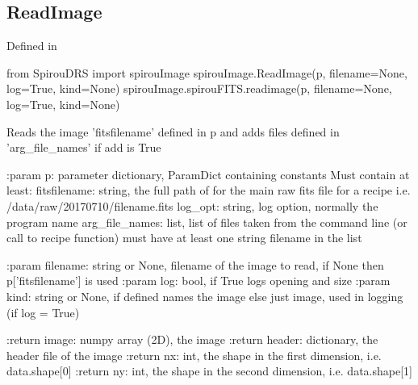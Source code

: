 \noindent\begin{minipage}{\textwidth}
\subsection{ReadImage}

Defined in \spirouImage{}

\begin{pythonbox}
from SpirouDRS import spirouImage
spirouImage.ReadImage(p, filename=None, log=True, kind=None)
spirouImage.spirouFITS.readimage(p, filename=None, log=True, kind=None)
\end{pythonbox}

\begin{pythondocstring}
Reads the image 'fitsfilename' defined in p and adds files defined in
'arg_file_names' if add is True

:param p: parameter dictionary, ParamDict containing constants
    Must contain at least:
            fitsfilename: string, the full path of for the main raw fits
                  file for a recipe
                  i.e. /data/raw/20170710/filename.fits
            log_opt: string, log option, normally the program name
            arg_file_names: list, list of files taken from the command line
                            (or call to recipe function) must have at least
                            one string filename in the list

:param filename: string or None, filename of the image to read, if None
                 then p['fitsfilename'] is used
:param log: bool, if True logs opening and size
:param kind: string or None, if defined names the image else just image,
             used in logging (if log = True)

:return image: numpy array (2D), the image
:return header: dictionary, the header file of the image
:return nx: int, the shape in the first dimension, i.e. data.shape[0]
:return ny: int, the shape in the second dimension, i.e. data.shape[1]
\end{pythondocstring}
\end{minipage}


